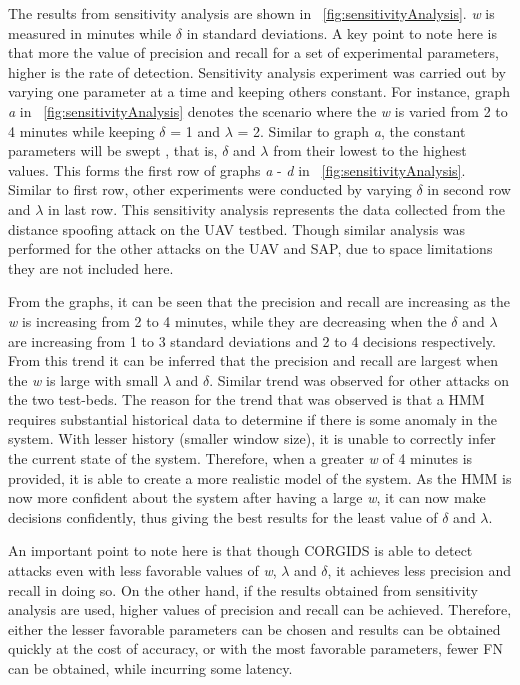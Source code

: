 The results from sensitivity analysis are shown in ~\autoref{fig:sensitivityAnalysis}. \textit{w} is measured in minutes while $\delta$ in standard deviations. A key point to note here is that more the value of precision and recall for a set of experimental parameters, higher is the rate of detection. Sensitivity analysis experiment was carried out by varying one parameter at a time and keeping others constant. For instance, graph \textit{a} in ~\autoref{fig:sensitivityAnalysis} denotes the scenario where the \textit{w} is varied from 2 to 4 minutes while keeping $\delta$ = 1 and $\lambda$ = 2. Similar to graph \textit{a}, the constant parameters will be swept , that is, $\delta$ and $\lambda$ from their lowest to the highest values. This forms the first row of graphs \textit{a} - \textit{d} in ~\autoref{fig:sensitivityAnalysis}. Similar to first row, other experiments were conducted by varying $\delta$ in second row and $\lambda$ in last row. This sensitivity analysis represents the data collected from the distance spoofing attack on the \ac{UAV} testbed. Though similar analysis was performed for the other attacks on the \ac{UAV} and \ac{SAP}, due to space limitations they are not included here. 

From the graphs, it can be seen that the precision and recall are increasing as the \textit{w} is increasing from 2 to 4 minutes, while they are decreasing when the $\delta$ and $\lambda$ are increasing from 1 to 3 standard deviations and 2 to 4 decisions respectively. From this trend it can be inferred that the precision and recall are largest when the \textit{w} is large with small $\lambda$ and $\delta$. Similar trend was observed for other attacks on the two test-beds. The reason for the trend that was observed is that a \ac{HMM} requires substantial historical data to determine if there is some anomaly in the system. With lesser history (smaller window size), it is unable to correctly infer the current state of the system. Therefore, when a greater \textit{w} of 4 minutes is provided, it is able to create a more realistic model of the system. As the \ac{HMM} is now more confident about the system after having a large \textit{w}, it can now make decisions confidently, thus giving the best results for the least value of $\delta$ and $\lambda$.


An important point to note here is that though \ac{CORGIDS} is able to detect attacks even with less favorable values of \textit{w}, $\lambda$ and $\delta$, it achieves less precision and recall in doing so. On the other hand, if the results obtained from sensitivity analysis are used, higher values of precision and recall can be achieved. Therefore, either the lesser favorable parameters can be chosen and results can be obtained quickly at the cost of accuracy, or with the most favorable parameters, fewer \ac{FN} can be obtained, while incurring some latency.


